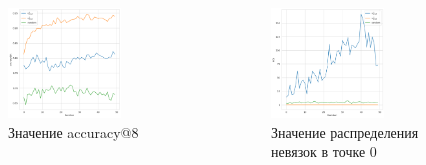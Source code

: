 \documentclass{beamer}
\begin{document}
\begin{frame}
\end{frame}


\begin{frame}
    \begin{columns}[c]
    
        \begin{figure}
            \centering
            \includegraphics[width=0.7\textwidth]{images/new_photo/accuracy.png}
            \caption{Значение accuracy@8}
        \end{figure}

        \begin{figure}
            \centering
            \includegraphics[width=0.7\textwidth]{images/new_photo/f.png}
            \caption{Значение распределения невязок в точке 0}
        \end{figure}


\end{columns}
\end{frame}
\end{document}
